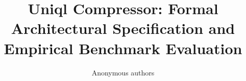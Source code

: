 \title{\textbf{Uniql Compressor: Formal Architectural Specification and Empirical Benchmark Evaluation}}

\author{Anonymous authors}
